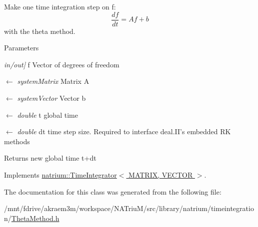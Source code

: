 Make one time integration step on f: \[ \frac{df}{dt} = Af+b \] with the theta method. 
\begin{DoxyParams}{Parameters}
\item[{\em in/out\mbox{]}}]f Vector of degrees of freedom \item[\mbox{$\leftarrow$} {\em systemMatrix}]Matrix A \item[\mbox{$\leftarrow$} {\em systemVector}]Vector b \item[\mbox{$\leftarrow$} {\em double}]t global time \item[\mbox{$\leftarrow$} {\em double}]dt time step size. Required to interface deal.II's embedded RK methods \end{DoxyParams}
\begin{DoxyReturn}{Returns}
new global time t+dt 
\end{DoxyReturn}


Implements \hyperlink{classnatrium_1_1TimeIntegrator_a1c438e41d183d172d524aa5dc97785fb}{natrium::TimeIntegrator$<$ MATRIX, VECTOR $>$}.

The documentation for this class was generated from the following file:\begin{DoxyCompactItemize}
\item 
/mnt/fdrive/akraem3m/workspace/NATriuM/src/library/natrium/timeintegration/\hyperlink{ThetaMethod_8h}{ThetaMethod.h}\end{DoxyCompactItemize}
